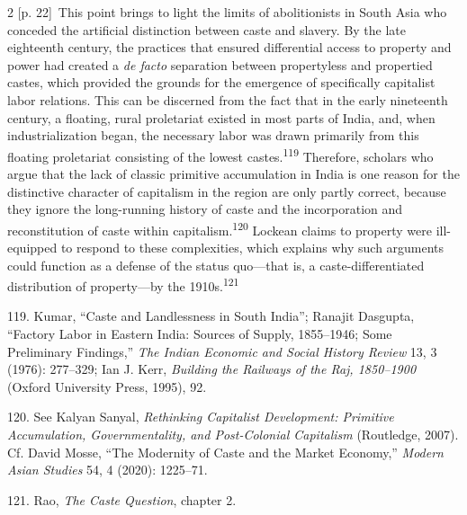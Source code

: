 \documentclass[10pt,a4paper]{article}
\begin{document}
\begin{paracol}{2}
{\scriptsize\color{gray} [p. 22]}\ This point brings to light the limits of abolitionists in South Asia who conceded the artificial distinction between caste and slavery. By the late eighteenth century, the practices that ensured differential access to property and power had created a \textit{de facto} separation between propertyless and propertied castes, which provided the grounds for the emergence of specifically capitalist labor relations. This can be discerned from the fact that in the early nineteenth century, a floating, rural proletariat existed in most parts of India, and, when industrialization began, the necessary labor was drawn primarily from this floating proletariat consisting of the lowest castes.\nobreak\textsuperscript{119} Therefore, scholars who argue that the lack of classic primitive accumulation in India is one reason for the distinctive character of capitalism in the region are only partly correct, because they ignore the long-running history of caste and the incorporation and reconstitution of caste within capitalism.\nobreak\textsuperscript{120} Lockean claims to property were ill-equipped to respond to these complexities, which explains why such arguments could function as a defense of the status quo—that is, a caste-differentiated distribution of property—by the 1910s.\nobreak\textsuperscript{121}\par{\small 119. Kumar, “Caste and Landlessness in South India”; Ranajit Dasgupta, “Factory Labor in Eastern India: Sources of Supply, 1855–1946; Some Preliminary Findings,” \textit{The Indian Economic and Social History Review} 13, 3 (1976): 277–329; Ian J. Kerr, \textit{Building the Railways of the Raj, 1850–1900} (Oxford University Press, 1995), 92.\par}{\small 120. See Kalyan Sanyal, \textit{Rethinking Capitalist Development: Primitive Accumulation, Governmentality, and Post-Colonial Capitalism} (Routledge, 2007). Cf. David Mosse, “The Modernity of Caste and the Market Economy,” \textit{Modern Asian Studies} 54, 4 (2020): 1225–71.\par}{\small 121. Rao, \textit{The Caste Question}, chapter 2.\par}
\switchcolumn*

\end{paracol}
\end{document}
